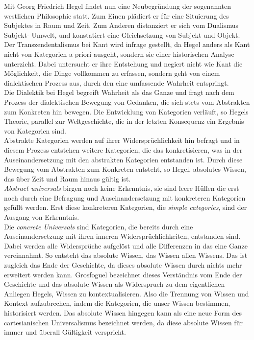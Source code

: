 Mit Georg Friedrich Hegel findet nun eine Neubegründung der sogenannten
westlichen Philosophie statt. Zum Einen plädiert er für eine Situierung des
Subjektes in Raum und Zeit.\footnotemark {}
 Zum Anderen distanziert er sich vom Dualismus
Subjekt- Umwelt, und konstatiert eine Gleichsetzung von Subjekt und Objekt. Der
Transzendentalismus bei Kant wird infrage gestellt, da Hegel anders als Kant
nicht von Kategorien a priori ausgeht, sondern sie einer historischen Analyse
unterzieht. Dabei untersucht er ihre Entstehung und negiert nicht wie Kant die
Möglichkeit, die Dinge vollkommen zu erfassen, sondern geht von einem
dialektischen Prozess aus, durch den eine umfassende Wahrheit entspringt.\footnotemark {}\\ 
Die Dialektik bei Hegel begreift Wahrheit als das Ganze und fragt nach dem
Prozess der dialektischen Bewegung von Gedanken, die sich stets vom Abstrakten
zum Konkreten hin bewegen. Die Entwicklung von Kategorien verläuft, so Hegels
Theorie, parallel zur Weltgeschichte, die in der letzten Konsequenz ein
Ergebnis von Kategorien sind.\footnotemark {}\\
Abstrakte Kategorien werden auf ihrer Widersprüchlichkeit hin befragt und in
diesem Prozess entstehen weitere Kategorien, die das konkretisieren, was in der
Auseinandersetzung mit den abstrakten Kategorien entstanden ist. Durch diese
Bewegung vom Abstrakten zum Konkreten entsteht, so Hegel, absolutes Wissen, das
über Zeit und Raum hinaus gültig ist.\\
\textit{Abstract universals} birgen noch keine
Erkenntnis, sie sind leere Hüllen die erst noch durch eine Befragung und
Auseinandersetzung mit konkreteren Kategorien gefüllt werden. Erst diese
konkreteren Kategorien, die \textit{simple categories}, sind der Ausgang von
Erkenntnis. \footnotemark {}\\
Die \textit{concrete Universals} sind Kategorien, die bereits durch eine
Auseinandersetzung mit ihren inneren Widersprüchlichkeiten, entstanden
sind.\footnotemark {} Dabei werden alle Widersprüche aufgelöst und alle Differenzen in das eine
Ganze vereinnahmt. So entsteht das absolute Wissen, das Wissen allen
Wissens.\footnotemark {} Das ist zugleich das Ende der Geschichte, da dieses absolute Wissen
durch nichts mehr erweitert werden kann. Grosfoguel bezeichnet dieses
Verständnis vom Ende der Geschichte und das absolute Wissen als Widerspruch zu
dem eigentlichen Anliegen Hegels, Wissen zu kontextualisieren. Also die
Trennung von Wissen und Kontext aufzubrechen, indem die Kategorien, die unser
Wissen bestimmen, historisiert werden. Das absolute Wissen hingegen kann als
eine neue Form des cartesianischen Universalismus bezeichnet werden, da diese
absolute Wissen für immer und überall Gültigkeit verspricht.\\


